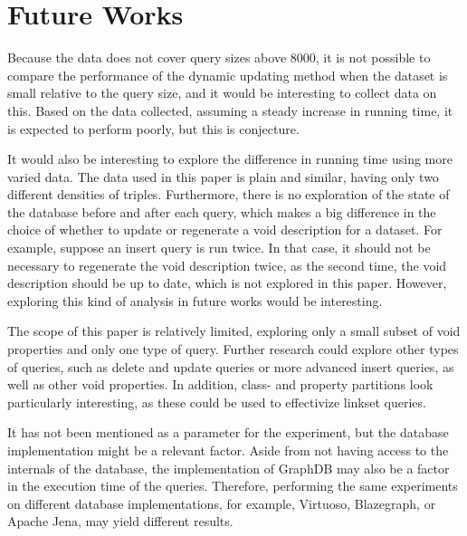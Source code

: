 \section{Future Works}\label{sec:future-works}
Because the data does not cover query sizes above 8000, it is not possible to compare the performance of the dynamic updating method when the dataset is small relative to the query size, and it would be interesting to collect data on this. Based on the data collected, assuming a steady increase in running time, it is expected to perform poorly, but this is conjecture.

It would also be interesting to explore the difference in running time using more varied data. The data used in this paper is plain and similar, having only two different densities of triples. Furthermore, there is no exploration of the state of the database before and after each query, which makes a big difference in the choice of whether to update or regenerate a \gls{void} description for a dataset. For example, suppose an insert query is run twice. In that case, it should not be necessary to regenerate the \gls{void} description twice, as the second time, the \gls{void} description should be up to date, which is not explored in this paper. However, exploring this kind of analysis in future works would be interesting.

The scope of this paper is relatively limited, exploring only a small subset of \gls{void} properties and only one type of query. Further research could explore other types of queries, such as delete and update queries or more advanced insert queries, as well as other \gls{void} properties. In addition, class- and property partitions look particularly interesting, as these could be used to effectivize linkset queries.

It has not been mentioned as a parameter for the experiment, but the database implementation might be a relevant factor. Aside from not having access to the internals of the database, the implementation of GraphDB may also be a factor in the execution time of the queries. Therefore, performing the same experiments on different database implementations, for example, Virtuoso, Blazegraph, or Apache Jena, may yield different results.